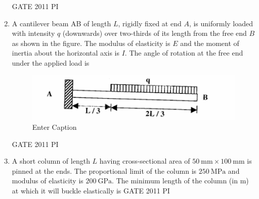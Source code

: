 \documentclass[journal,12pt,onecolumn]{IEEEtran}
\theoremstyle{remark}
\begin{document}
\begin{enumerate}
\hfill{GATE 2011 PI}
\begin{enumerate}
\end{enumerate}
\item
A cantilever beam AB of length $L$, rigidly fixed at end $A$, is uniformly loaded with intensity $q$ (downwards) over two-thirds of its length from the free end $B$ as shown in the figure. The modulus of elasticity is $E$ and the moment of inertia about the horizontal axis is $I$. The angle of rotation at the free end under the applied load is
\begin{figure}[H]
    \centering
    \includegraphics[width=0.5\linewidth]{figs/Q.30.png}
    \caption{Enter Caption}
    \label{fig:figs/Q.30.png}
\end{figure}
\hfill{GATE 2011 PI}
\begin{enumerate}
\end{enumerate}
\item
A short column of length $L$ having cross-sectional area of $50~\text{mm} \times 100~\text{mm}$ is pinned at the ends. The proportional limit of the column is $250~\text{MPa}$ and modulus of elasticity is $200~\text{GPa}$. The minimum length of the column (in m) at which it will buckle elastically is
\hfill{GATE 2011 PI}
\begin{enumerate}
\end{enumerate}


\end{enumerate}
\end{document}

